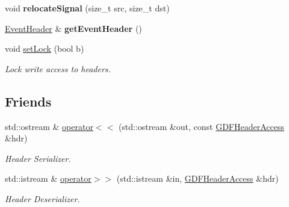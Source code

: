 \begin{DoxyCompactItemize}
\item 
\hypertarget{classgdf_1_1_g_d_f_header_access_a2792c0cf7366b9cebc82fd678aca39d6}{
void {\bfseries relocateSignal} (size\_\-t src, size\_\-t dst)}
\label{classgdf_1_1_g_d_f_header_access_a2792c0cf7366b9cebc82fd678aca39d6}

\item 
\hypertarget{classgdf_1_1_g_d_f_header_access_aabd8f13f27a8adc2de36a356b3674c07}{
\hyperlink{classgdf_1_1_event_header}{EventHeader} \& {\bfseries getEventHeader} ()}
\label{classgdf_1_1_g_d_f_header_access_aabd8f13f27a8adc2de36a356b3674c07}

\item 
\hypertarget{classgdf_1_1_g_d_f_header_access_a7e27e4527cebe030b3fd268defbeb95f}{
void \hyperlink{classgdf_1_1_g_d_f_header_access_a7e27e4527cebe030b3fd268defbeb95f}{setLock} (bool b)}
\label{classgdf_1_1_g_d_f_header_access_a7e27e4527cebe030b3fd268defbeb95f}

\begin{DoxyCompactList}\small\item\em Lock write access to headers. \item\end{DoxyCompactList}\end{DoxyCompactItemize}
\subsection*{Friends}
\begin{DoxyCompactItemize}
\item 
\hypertarget{classgdf_1_1_g_d_f_header_access_a0dd6213f6ada6c22b9c2e8e7890305a2}{
std::ostream \& \hyperlink{classgdf_1_1_g_d_f_header_access_a0dd6213f6ada6c22b9c2e8e7890305a2}{operator$<$$<$} (std::ostream \&out, const \hyperlink{classgdf_1_1_g_d_f_header_access}{GDFHeaderAccess} \&hdr)}
\label{classgdf_1_1_g_d_f_header_access_a0dd6213f6ada6c22b9c2e8e7890305a2}

\begin{DoxyCompactList}\small\item\em Header Serializer. \item\end{DoxyCompactList}\item 
\hypertarget{classgdf_1_1_g_d_f_header_access_a0a4dea8648fdd7b1131f900f772d2961}{
std::istream \& \hyperlink{classgdf_1_1_g_d_f_header_access_a0a4dea8648fdd7b1131f900f772d2961}{operator$>$$>$} (std::istream \&in, \hyperlink{classgdf_1_1_g_d_f_header_access}{GDFHeaderAccess} \&hdr)}
\label{classgdf_1_1_g_d_f_header_access_a0a4dea8648fdd7b1131f900f772d2961}

\begin{DoxyCompactList}\small\item\em Header Deserializer. \item\end{DoxyCompactList}\end{DoxyCompactItemize}


